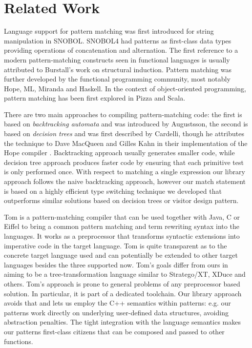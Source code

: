\section{Related Work} %
\label{sec:rw}

Language support for pattern matching was first introduced for string 
manipulation in SNOBOL\cite{SNOBOL64}. SNOBOL4 had patterns as first-class data 
types providing operations of concatenation and alternation\cite{SNOBOL71}. The 
first reference to a modern pattern-matching constructs seen in functional 
languages is usually attributed to Burstall's work on structural 
induction\cite{Burstall69provingproperties}. Pattern matching was further 
developed by the functional programming community, most notably 
Hope\cite{BMS80}, ML\cite{ML90}, Miranda\cite{Miranda85} and 
Haskell\cite{Haskell98Book}. In the context of object-oriented programming, 
pattern matching has been first explored in Pizza\cite{Odersky97pizzainto} and 
Scala\cite{Scala2nd,EmirThesis}.

There are two main approaches to compiling pattern-matching code: the first is 
based on \emph{backtracking automata} and was introduced by Augustsson\cite{Augustsson85}, 
the second is based on \emph{decision trees} and was first described by 
Cardelli\cite{Cardelli84}, though he attributes the technique to Dave MacQueen 
and Gilles Kahn in their implementation of the Hope compiler \cite{BMS80}.
Backtracking approach usually generates smaller code, while decision tree 
approach produces faster code by ensuring that each primitive test is only 
performed once. With respect to matching a single expression our library 
approach follows the naive backtracking approach, however our match statement is 
based on a highly efficient type switching technique we developed\cite{TypeSwitch} 
that outperforms similar solutions based on decision trees or visitor design pattern.

Tom is a pattern-matching compiler that can be used together with Java, C or 
Eiffel to bring a common pattern matching and term rewriting syntax into the 
languages\cite{Moreau:2003}. It works as a preprocessor that transforms 
syntactic extensions into imperative code in the target language. Tom is quite 
transparent as to the concrete target language used and can potentially be 
extended to other target languages besides the three supported now.
Tom's  goals differ from ours in aiming to be a
tree-transformation language similar to Stratego/XT, XDuce and others. 
Tom's approach is prone to general problems of any preprocessor based 
solution\cite[]{SELL}. In particular, it is part of a dedicated toolchain.
Our library approach avoids that and lets us employ the C++ semantics within 
patterns: e.g. our patterns work directly on underlying user-defined data 
structures, avoiding abstraction penalties. The tight integration with 
the language semantics makes our patterns first-class citizens that can be 
composed and passed to other functions. 

